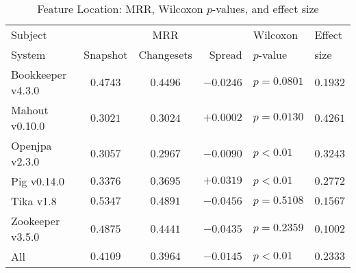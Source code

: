 \begin{table}[t]
\centering
\caption{Feature Location: MRR, Wilcoxon $p$-values, and effect size}
\begin{tabular}{l|ccr|ll}
\toprule
Subject & & MRR & & Wilcoxon & Effect \\
System  &  Snapshot & Changesets & Spread & $p$-value & size \\
\midrule
Bookkeeper v4.3.0 & $\bm{0.4743}$ & $0.4496$ & $-0.0246$ & $p = 0.0801$ & $0.1932$ \\
Mahout v0.10.0 & $0.3021$ & $\bm{0.3024}$ & $+0.0002$ & $p = 0.0130$ & $0.4261$ \\
Openjpa v2.3.0 & $\bm{0.3057}$ & $0.2967$ & $-0.0090$ & $p < 0.01$ & $0.3243$ \\
Pig v0.14.0 & $0.3376$ & $\bm{0.3695}$ & $+0.0319$ & $p < 0.01$ & $0.2772$ \\
Tika v1.8 & $\bm{0.5347}$ & $0.4891$ & $-0.0456$ & $p = 0.5108$ & $0.1567$ \\
Zookeeper v3.5.0 & $\bm{0.4875}$ & $0.4441$ & $-0.0435$ & $p = 0.2359$ & $0.1002$ \\
\midrule
All & $\bm{0.4109}$ & $0.3964$ & $-0.0145$ & $p < 0.01$ & $0.2333$ \\
\bottomrule
\end{tabular}
\label{table:feature_location_rq1}
\end{table}
